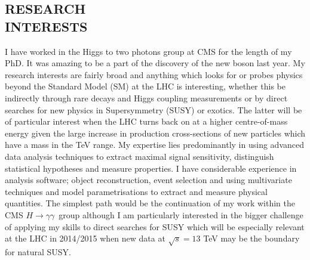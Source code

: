 \documentclass[margin, 10pt]{res} %
\newcommand{\Htogg}{\ensuremath{H\rightarrow\gamma\gamma}~}
\begin{document}
\begin{resume}


\section{RESEARCH \\ INTERESTS}


I have worked in the Higgs to two photons group at CMS for the length of my PhD.
It was amazing to be a part of the discovery of the new boson last year.
My research interests are fairly broad and anything which looks for or probes physics beyond the Standard Model (SM) at the LHC is interesting, whether this be indirectly through rare decays and Higgs coupling measurements or by direct searches for new physics in Supersymmetry (SUSY) or exotics.
The latter will be of particular interest when the LHC turns back on at a higher centre-of-mass energy given the large increase in production cross-sections of new particles which have a mass in the TeV range. My expertise lies predominantly in using advanced data analysis techniques to extract maximal signal sensitivity, distinguish statistical hypotheses and measure properties. I have considerable experience in analysis software; object reconstruction, event selection and using multivariate techniques and model parametrisations to extract and measure physical quantities.
The simplest path would be the continuation of my work within the CMS \Htogg group although I am particularly interested in the bigger challenge of applying my skills to direct searches for SUSY which will be especially relevant at the LHC in 2014/2015 when new data at $\sqrt{s}=13$ TeV may be the boundary for natural SUSY.


\end{resume}
\end{document}
